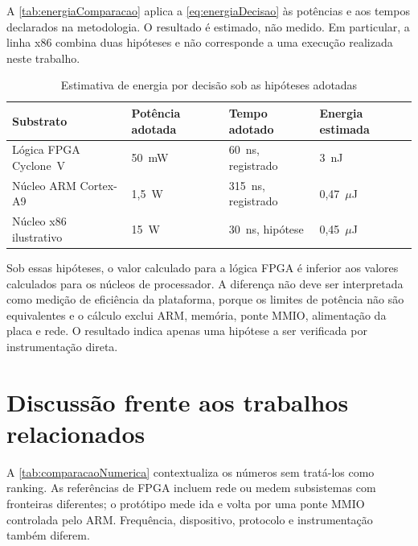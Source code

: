 A \autoref{tab:energiaComparacao} aplica a \autoref{eq:energiaDecisao} às potências e aos tempos declarados na metodologia. O resultado é estimado, não medido. Em particular, a linha x86 combina duas hipóteses e não corresponde a uma execução realizada neste trabalho.

\begin{table}[htb]
\caption{Estimativa de energia por decisão sob as hipóteses adotadas}
\label{tab:energiaComparacao}
\begin{tabularx}{\textwidth}{lXXX}
\toprule
\textbf{Substrato} & \textbf{Potência adotada} & \textbf{Tempo adotado} & \textbf{Energia estimada} \\ \midrule
Lógica FPGA Cyclone~V & 50~mW & 60~ns, registrado & 3~nJ \\
Núcleo ARM Cortex-A9 & 1,5~W & 315~ns, registrado & 0,47~$\mu$J \\
Núcleo x86 ilustrativo & 15~W & 30~ns, hipótese & 0,45~$\mu$J \\ \bottomrule
\end{tabularx}
\end{table}

Sob essas hipóteses, o valor calculado para a lógica FPGA é inferior aos valores calculados para os núcleos de processador. A diferença não deve ser interpretada como medição de eficiência da plataforma, porque os limites de potência não são equivalentes e o cálculo exclui ARM, memória, ponte MMIO, alimentação da placa e rede. O resultado indica apenas uma hipótese a ser verificada por instrumentação direta.

\section{Discussão frente aos trabalhos relacionados}\label{subsec:comparacaoLiteraturaBench}

A \autoref{tab:comparacaoNumerica} contextualiza os números sem tratá-los como ranking. As referências de FPGA incluem rede ou medem subsistemas com fronteiras diferentes; o protótipo mede ida e volta por uma ponte MMIO controlada pelo ARM. Frequência, dispositivo, protocolo e instrumentação também diferem.


